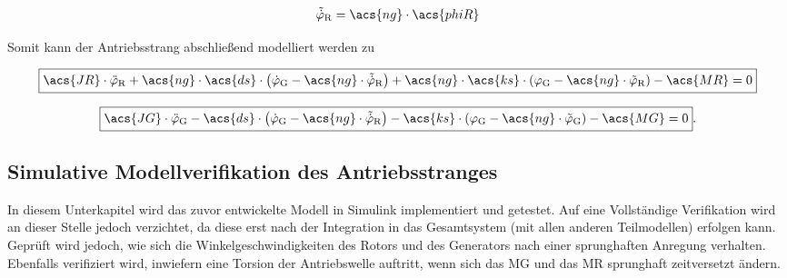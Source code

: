 \begin{align}
    \tilde{\dot\varphi}_{\mathrm{R}} = \acs{ng} \cdot \acs{phiR}
    \label{eq:Gleichung4.8}
\end{align}

Somit kann der Antriebsstrang abschließend modelliert werden zu

\begin{equation}
    \label{eq:Gleichung4.9}
   \boxed{\acs{JR} \cdot \ddot{\varphi}_{\mathrm{R}} + \acs{ng} \cdot \acs{ds} \cdot \left( \dot\varphi_{\mathrm{G}} - \acs{ng} \cdot \tilde{\dot\varphi}_{\mathrm{R}}\right) + \acs{ng} \cdot \acs{ks} \cdot \left( \varphi_{\mathrm{G}} - \acs{ng} \cdot \tilde{\varphi}_{\mathrm{R}}\right) - \acs{MR} = 0}
\end{equation}

\begin{equation}
   \label{eq:Gleichung4.10}
   \boxed{\acs{JG} \cdot \ddot{\varphi}_{\mathrm{G}} - \acs{ds} \cdot \left( \dot\varphi_{\mathrm{G}} - \acs{ng} \cdot \tilde{\dot\varphi}_{\mathrm{R}}\right) - \acs{ks} \cdot \left( \varphi_{\mathrm{G}} - \acs{ng} \cdot \tilde{\varphi}_{\mathrm{G}}\right) - \acs{MG} = 0}.
\end{equation}
\clearpage

\subsection{Simulative Modellverifikation des Antriebsstranges}

In diesem Unterkapitel wird das zuvor entwickelte Modell in Simulink implementiert und getestet. Auf eine Vollständige Verifikation wird an dieser Stelle jedoch verzichtet, da diese erst nach der Integration in das Gesamtsystem (mit allen anderen Teilmodellen) erfolgen kann. Geprüft wird jedoch, wie sich die Winkelgeschwindigkeiten des Rotors und des Generators nach einer sprunghaften Anregung verhalten. Ebenfalls verifiziert wird, inwiefern eine Torsion der Antriebswelle auftritt, wenn sich das \acl{MG} und das \acl{MR} sprunghaft zeitversetzt ändern. \\

